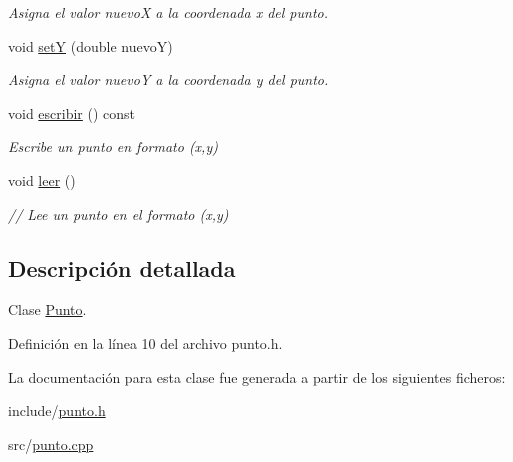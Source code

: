 \begin{DoxyCompactItemize}
\begin{DoxyCompactList}\small\item\em Asigna el valor nuevoX a la coordenada x del punto. \end{DoxyCompactList}\item 
void \hyperlink{classPunto_a6a0f8adb5946f31a7867a06f54d97462}{setY} (double nuevoY)\hypertarget{classPunto_a6a0f8adb5946f31a7867a06f54d97462}{}\label{classPunto_a6a0f8adb5946f31a7867a06f54d97462}

\begin{DoxyCompactList}\small\item\em Asigna el valor nuevoY a la coordenada y del punto. \end{DoxyCompactList}\item 
void \hyperlink{classPunto_afc543b48134f632fa354d8b027954e80}{escribir} () const \hypertarget{classPunto_afc543b48134f632fa354d8b027954e80}{}\label{classPunto_afc543b48134f632fa354d8b027954e80}

\begin{DoxyCompactList}\small\item\em Escribe un punto en formato (x,y) \end{DoxyCompactList}\item 
void \hyperlink{classPunto_a84cc9b0ee2e5b00842e7bff819b80459}{leer} ()\hypertarget{classPunto_a84cc9b0ee2e5b00842e7bff819b80459}{}\label{classPunto_a84cc9b0ee2e5b00842e7bff819b80459}

\begin{DoxyCompactList}\small\item\em // Lee un punto en el formato (x,y) \end{DoxyCompactList}\end{DoxyCompactItemize}


\subsection{Descripción detallada}
Clase \hyperlink{classPunto}{Punto}. 

Definición en la línea 10 del archivo punto.\+h.



La documentación para esta clase fue generada a partir de los siguientes ficheros\+:\begin{DoxyCompactItemize}
\item 
include/\hyperlink{punto_8h}{punto.\+h}\item 
src/\hyperlink{punto_8cpp}{punto.\+cpp}\end{DoxyCompactItemize}
